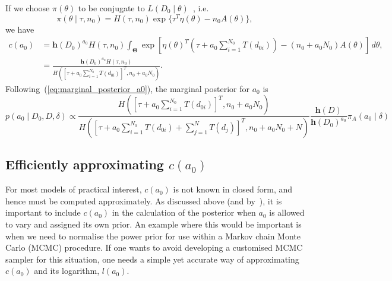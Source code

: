 \documentclass[a4paper, notitlepage, 11pt]{article}
\begin{document}
If we choose $\pi(\theta)$ to be conjugate to $L(D_0 \mid \theta)$~\citep{Diaconis1979}, i.e.
\begin{equation*}
 \label{eq:conj_exp_family}
 \pi(\theta \mid \tau, n_0) = H(\tau, n_0) \exp\{ \tau^T\eta(\theta) - n_0A(\theta) \},
\end{equation*}
we have 
\begin{align}
 \label{eq:expo_family_const_conj}
 c(a_0) &= \boldsymbol h(D_0)^{a_0} H(\tau, n_0) \int_{\boldsymbol\Theta}  \exp \left[ \eta(\theta)^T \left( \tau + a_0\sum_{i=1}^{N_0} T(d_{0i}) \right) -(n_0  + a_0N_0) A(\theta) \right] \, d\theta, \\
 &= \frac{\boldsymbol h(D_0)^{a_0} H(\tau, n_0)}{H\left( \left[\tau + a_0\sum_{i=1}^{N_0} T(d_{0i})\right]^T, n_0  + a_0N_0 \right)}.
\end{align}
Following~(\ref{eq:marginal_posterior_a0}), the marginal posterior for $a_0$ is 
\begin{equation}
 \label{eq:marginal_posterior_a0_expoFamily}
 p(a_0 \mid D_0, D, \delta) \propto \frac{H\left( \left[\tau + a_0\sum_{i=1}^{N_0} T(d_{0i})\right]^T, n_0  + a_0N_0 \right)}{H\left( \left[\tau + a_0\sum_{i=1}^{N_0} T(d_{0i}) + \sum_{j=1}^{N} T(d_{j}) \right]^T, n_0  + a_0N_0 + N \right)} \frac{\boldsymbol h(D)}{\boldsymbol h(D_0)^{a_0} } \pi_A(a_0 \mid \delta)
\end{equation}


\subsection{Efficiently approximating $c(a_0)$}
\label{sec:efficient_computation_ca0}

For most models of practical interest, $c(a_0)$ is not known in closed form, and hence must be computed approximately.
As discussed above (and by~\cite{Neuenschwander2009}), it is important to include $c(a_0)$ in the calculation of the posterior when $a_0$ is allowed to vary and assigned its own prior.
An example where this would be important is when we need to normalise the power prior for use within a Markov chain Monte Carlo (MCMC) procedure.
If one wants to avoid developing a customised MCMC sampler for this situation, one needs a simple yet accurate way of approximating $c(a_0)$ and its logarithm, $l(a_0)$.
\end{document}
